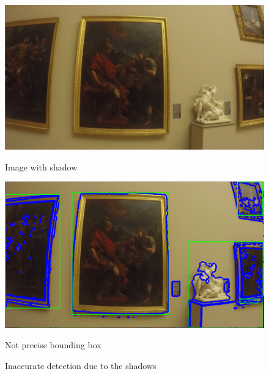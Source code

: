 \begin{figure}[h]
      \includegraphics[width=\linewidth]{pictures/painting_detection/detection_withoutNN_1.PNG}
      \caption*{Image with shadow}\label{fig:shadow1}
    \endminipage\hfill
      \includegraphics[width=\linewidth]{pictures/painting_detection/detection_withoutNN_3.PNG}
      \caption*{Not precise bounding box}\label{fig:shadow2}
    \endminipage\hfill
    \caption{Inaccurate detection due to the shadows}\label{fig:innaccurate_detection}
\end{figure}







